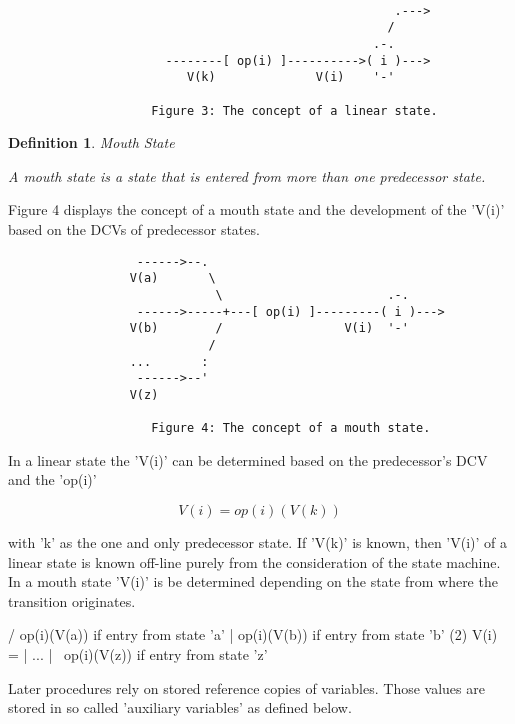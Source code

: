 \documentclass[12pt]{article}
\newtheorem{definition}{Definition}
\begin{document}
\begin{verbatim}
    
                                                      .---> 
                                                     /
                                                   .-.
                      --------[ op(i) ]---------->( i )---> 
                         V(k)              V(i)    '-'

                    Figure 3: The concept of a linear state.

\end{verbatim}

\begin{definition}
Mouth State

A mouth state is a state that is entered from more than one predecessor 
state. 
\end{definition}
    
Figure 4 displays the concept of a mouth state and the development of the
'V(i)' based on the DCVs of predecessor states.

\begin{verbatim}
                  ------>--.  
                 V(a)       \ 
                             \                       .-.
                  ------>-----+---[ op(i) ]---------( i )---> 
                 V(b)        /                 V(i)  '-'
                            /
                 ...       :
                  ------>--'
                 V(z)

                    Figure 4: The concept of a mouth state.
\end{verbatim}

In a linear state the 'V(i)' can be determined based on the predecessor's
DCV and the 'op(i)'

\[
            V(i) = op(i)(V(k))                                         
\]

with 'k' as the one and only predecessor state. If 'V(k)' is known, then
'V(i)' of a linear state is known off-line purely from the consideration of
the state machine.  In a mouth state 'V(i)' is be determined depending on the
state from where the transition originates.

                    /  op(i)(V(a))  if entry from state 'a'
                    |  op(i)(V(b))  if entry from state 'b'             (2)
            V(i) =  |   ...
                    |  
                    \  op(i)(V(z))  if entry from state 'z'

Later procedures rely on stored reference copies of variables. Those values
are stored in so called 'auxiliary variables' as defined below.
\end{document}
